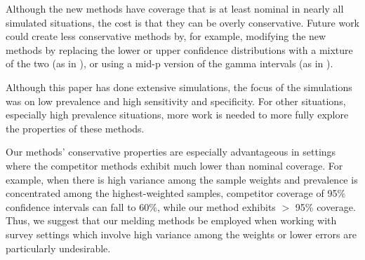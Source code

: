 Although the new methods have coverage that is at least nominal in nearly all simulated situations, the cost is that they can be overly conservative.
Future work could create less conservative methods by, for example, modifying the new methods by replacing the lower or upper confidence distributions with a mixture of the two (as in \citep{veronese2015}), or using a mid-p version of the gamma intervals (as in \citep{FayK:2017}).

Although this paper has done extensive simulations, the focus of the simulations was on low prevalence and high
sensitivity and specificity. For other situations, especially high prevalence situations, more work is needed to more fully explore the properties of these methods.

Our methods' conservative properties are especially advantageous in settings where the competitor methods exhibit much lower than nominal coverage.
For example, when there is high variance among the sample weights and prevalence is concentrated among the highest-weighted samples, competitor coverage of 95\% confidence intervals can fall to 60\%, while our method exhibits \( > \) 95\% coverage.
Thus, we suggest that our melding methods be employed when working with survey settings which involve high variance among the weights or lower errors are particularly undesirable.
